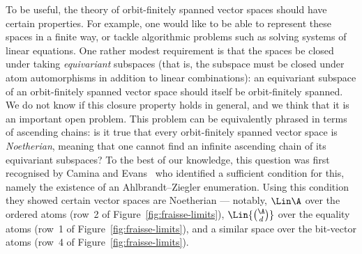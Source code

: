 To be useful, the theory of orbit-finitely spanned vector spaces should have certain properties. 
For example, one would like to be able to represent these spaces in a finite way, or tackle algorithmic problems such as solving systems of linear equations. 
One rather modest requirement is that the spaces be closed under taking \emph{equivariant} subspaces 
(that is, the subspace must be closed under atom automorphisms in addition to linear combinations): 
an equivariant subspace of an orbit-finitely spanned vector space should itself be orbit-finitely spanned. 
We do not know if this closure property holds in general, and we think that it is an important open problem. 
This problem can be equivalently phrased in terms of ascending chains: 
is it true that every orbit-finitely spanned vector space is \emph{Noetherian}, meaning that one cannot find an infinite ascending chain of its equivariant subspaces? 
To the best of our knowledge, this question was first recognised by Camina and Evans~\cite[Q.~2]{CaminaEvans_91} who identified a sufficient condition for this, namely the existence of an Ahlbrandt--Ziegler enumeration. 
Using this condition they showed certain vector spaces are Noetherian --- notably, $\Lin \A$ over the ordered atoms (row~2 of Figure~\ref{fig:fraisse-limits}), $\Lin {\binom \A d}$ over the equality atoms (row~1 of Figure~\ref{fig:fraisse-limits}), and a similar space over the bit-vector atoms (row~4 of Figure~\ref{fig:fraisse-limits}). 

